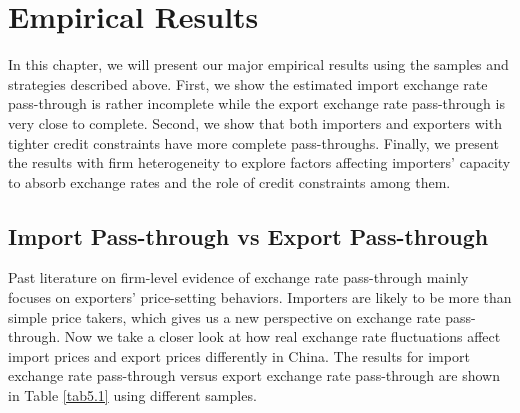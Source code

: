 \chapter{Empirical Results}\label{sec-5.results}
In this chapter, we will present our major empirical results using the samples and strategies described above. First, we show the estimated import exchange rate pass-through is rather incomplete while the export exchange rate pass-through is very close to complete. Second, we show that both importers and exporters with tighter credit constraints have more complete pass-throughs. Finally, we present the results with firm heterogeneity to explore factors affecting importers' capacity to absorb exchange rates and the role of credit constraints among them.

\section{Import Pass-through vs Export Pass-through}\label{sec-5.1}

Past literature on firm-level evidence of exchange rate pass-through mainly focuses on exporters' price-setting behaviors. Importers are likely to be more than simple price takers, which gives us a new perspective on exchange rate pass-through. Now we take a closer look at how real exchange rate fluctuations affect import prices and export prices differently in China. The results for import exchange rate pass-through versus export exchange rate pass-through are shown in Table \ref{tab5.1} using different samples.

